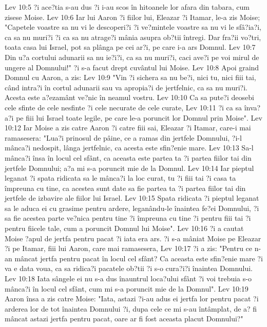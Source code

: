 Lev 10:5  ?i ace?tia s-au dus ?i i-au scos în hitoanele lor afara din tabara, cum zisese Moise.
Lev 10:6  Iar lui Aaron ?i fiilor lui, Eleazar ?i Itamar, le-a zis Moise; "Capetele voastre sa nu vi le descoperi?i ?i ve?mintele voastre sa nu vi le sfâ?ia?i, ca sa nu muri?i ?i ca sa nu atrage?i mânia asupra ob?tii întregi. Dar fra?ii vo?tri, toata casa lui Israel, pot sa plânga pe cei ar?i, pe care i-a ars Domnul.
Lev 10:7  Din u?a cortului adunarii sa nu ie?i?i, ca sa nu muri?i, caci ave?i pe voi mirul de ungere al Domnului!" ?i s-a facut drept cuvântul lui Moise.
Lev 10:8  Apoi graind Domnul cu Aaron, a zis:
Lev 10:9  "Vin ?i sichera sa nu be?i, nici tu, nici fiii tai, când intra?i în cortul adunarii sau va apropia?i de jertfelnic, ca sa nu muri?i. Acesta este a?ezamânt ve?nic în neamul vostru.
Lev 10:10  Ca sa pute?i deosebi cele sfinte de cele nesfinte ?i cele necurate de cele curate,
Lev 10:11  ?i ca sa înva?a?i pe fiii lui Israel toate legile, pe care le-a poruncit lor Domnul prin Moise".
Lev 10:12  Iar Moise a zis catre Aaron ?i catre fiii sai, Eleazar ?i Itamar, care-i mai ramasesera: "Lua?i prinosul de pâine, ce a ramas din jertfele Domnului, ?i-l mânca?i nedospit, lânga jertfelnic, ca acesta este sfin?enie mare.
Lev 10:13  Sa-l mânca?i însa în locul cel sfânt, ca aceasta este partea ta ?i partea fiilor tai din jertfele Domnului; a?a mi s-a poruncit mie de la Domnul.
Lev 10:14  Iar pieptul leganat ?i spata ridicata sa le mânca?i la loc curat, tu ?i fiii tai ?i casa ta împreuna cu tine, ca acestea sunt date sa fie partea ta ?i partea fiilor tai din jertfele de izbavire ale fiilor lui Israel.
Lev 10:15  Spata ridicata ?i pieptul leganat sa le aduca ei cu grasime pentru ardere, leganându-le înaintea fe?ei Domnului, ?i sa fie acestea parte ve?nica pentru tine ?i împreuna cu tine ?i pentru fiii tai ?i pentru fiicele tale, cum a poruncit Domnul lui Moise".
Lev 10:16  ?i a cautat Moise ?apul de jertfa pentru pacat ?i iata era ars. ?i s-a mâniat Moise pe Eleazar ?i pe Itamar, fiii lui Aaron, care mai ramasesera,
Lev 10:17  ?i a zis: "Pentru ce n-an mâncat jertfa pentru pacat în locul cel sfânt? Ca aceasta este sfin?enie mare ?i va e data voua, ca sa ridica?i pacatele ob?tii ?i s-o cura?i?i înaintea Domnului.
Lev 10:18  Iata sângele ei nu s-a dus înauntrul loca?ului sfânt ?i voi trebuia s-o mânca?i în locul cel sfânt, cum mi s-a poruncit mie de la Domnul".
Lev 10:19  Aaron însa a zis catre Moise: "Iata, astazi ?i-au adus ei jertfa lor pentru pacat ?i arderea lor de tot înaintea Domnului ?i, dupa cele ce mi s-au întâmplat, de a? fi mâncat astazi jertfa pentru pacat, oare ar fi fost aceasta placut Domnului?"
